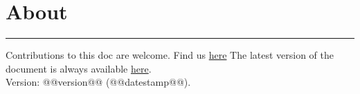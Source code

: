 \section{About}
\hrule

\medskip

Contributions to this doc are welcome. Find us \href{https://github.com/robert-will-brown/video-streaming-cheatsheet}{here}
The latest version of the document is always available \href{https://bit.ly/3p1Omqh}{here}.
~\\

Version: @@version@@ (@@datestamp@@).
